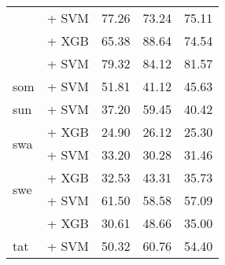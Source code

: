 \begin{sidewaystable}[h]
{\begin{tabular}{llccc}
                                               & \citep{wang2024multilingual} + SVM                                 & 77.26                                & 73.24              & 75.11             \\
                                               & \citep{snegirev2025russianfocusedembeddersexplorationrumteb} + XGB & 65.38                                & 88.64              & 74.54             \\
                                               & \citep{snegirev2025russianfocusedembeddersexplorationrumteb} + SVM & 79.32                                & 84.12              & 81.57             \\
            \midrule
            som                                & \citep{wang2024multilingual} + SVM                                 & 51.81                                & 41.12              & 45.63             \\
            \midrule
            sun                                & \citep{wang2024multilingual} + SVM                                 & 37.20                                & 59.45              & 40.42             \\
            \midrule
            \multirow{2}{*}{swa}               & \citep{wang2023improving} + XGB                                    & 24.90                                & 26.12              & 25.30             \\
                                               & \citep{wang2024multilingual} + SVM                                 & 33.20                                & 30.28              & 31.46             \\
            \midrule
            \multirow{2}{*}{swe}               & \citep{wang2024multilingual} + XGB                                 & 32.53                                & 43.31              & 35.73             \\
                                               & \citep{wang2024multilingual} + SVM                                 & 61.50                                & 58.58              & 57.09             \\
                                               & \citep{kummervold-etal-2021-operationalizing} + XGB                & 30.61                                & 48.66              & 35.00             \\
            \midrule
            tat                                & \citep{wang2024multilingual} + SVM                                 & 50.32                                & 60.76              & 54.40             \\

\end{tabular}}
\end{sidewaystable}
